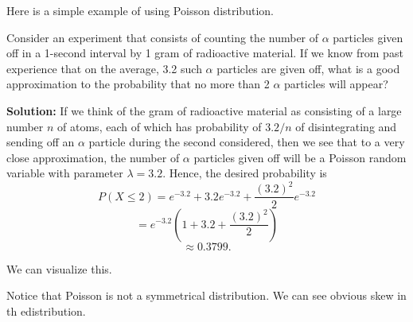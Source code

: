 Here is a simple example of using Poisson distribution.
\begin{example}
    Consider an experiment that consists of counting the number of \(\alpha\) particles given off in a 1-second interval by 1 gram of radioactive material. If we know from past experience that on the average, 3.2 such \(\alpha\) particles are given off, what is a good approximation to the probability that no more than 2 \(\alpha\) particles will appear?
    
    \textbf{Solution:} If we think of the gram of radioactive material as consisting of a large number \(n\) of atoms, each of which has probability of \(3.2/n\) of disintegrating and sending off an \(\alpha\) particle during the second considered, then we see that to a very close approximation, the number of \(\alpha\) particles given off will be a Poisson random variable with parameter \(\lambda = 3.2\). Hence, the desired probability is
    \[
    P(X \leq 2) = e^{-3.2} + 3.2 e^{-3.2} + \frac{(3.2)^2}{2} e^{-3.2}
    \]
    \[
    = e^{-3.2} \left(1 + 3.2 + \frac{(3.2)^2}{2}\right)
    \]
    \[
    \approx 0.3799.
    \]

    We can visualize this.
    \poissondata

\begin{center}
\end{center}
Notice that Poisson is not a symmetrical distribution. We can see obvious skew in th edistribution.
\end{example}

